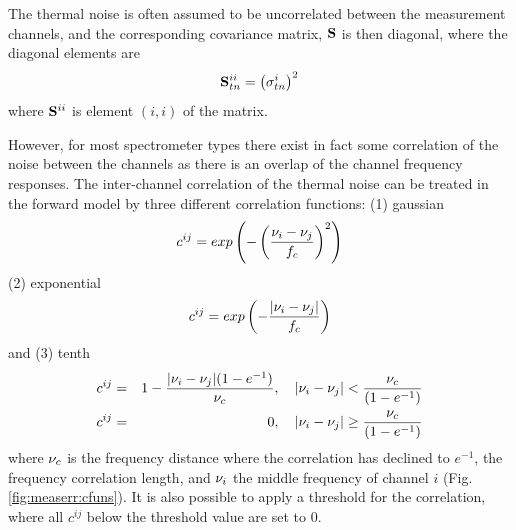  
 

 \label{sec:measerr:mtn}
 
 
 The thermal noise is often assumed to be uncorrelated between the
 measurement channels, and the corresponding covariance matrix,
 $\mathbf{S}$ is then diagonal, where the diagonal elements are
 \begin{equation}
   \mathbf{S}_{tn}^{ii} = \left( \sigma_{tn}^i \right)^2
  \label{eq:measerr:Stn_diag}
 \end{equation}
 where $\mathbf{S}^{ii}$ is element $(i,i)$ of the matrix.
 
 However, for most spectrometer types there exist in fact some
 correlation of the noise between the channels as there is an overlap
 of the channel frequency responses.  The inter-channel correlation of
 the thermal noise can be treated in the forward model by three
 different correlation functions: (1) gaussian
 \begin{equation}
  c^{ij} = exp\left(-\left(\frac{\nu_i-\nu_j}{f_c}\right)^2\right)
 \end{equation}
 (2) exponential
 \begin{equation}
  c^{ij} = exp\left(-\frac{|\nu_i-\nu_j|}{f_c}\right)
 \end{equation}
 and (3) tenth
 \begin{eqnarray}
  c^{ij} &=& 1-\frac{|\nu_i-\nu_j|(1-e^{-1})}{\nu_c}, \quad 
            |\nu_i-\nu_j| < \frac{\nu_c}{(1-e^{-1})} \nonumber \\
  c^{ij} &=& 0, \quad |\nu_i-\nu_j| \geq \frac{\nu_c}{(1-e^{-1})}
 \end{eqnarray}
 where $\nu_c$ is the frequency distance where the correlation has
 declined to $e^{-1}$, the frequency correlation length, and $\nu_i$
 the middle frequency of channel $i$ (Fig. \ref{fig:measerr:cfuns}).
 It is also possible to apply a threshold for the correlation, where
 all $c^{ij}$ below the threshold value are set to 0.


